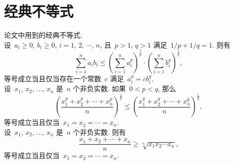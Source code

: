 \chapter{经典不等式}
论文中用到的经典不等式.\\

设~$a_i\geq0$, $b_i\geq0$, $i=1$, $2$, $\cdots$, $n$, 且~$p>1$, $q>1$
满足~$1/p+1/q=1$. 则有
\[
    \sum_{i=1}^{n}a_ib_i\leq\left(\sum_{i=1}^{n}a_i^p\right)^{\frac1p}
    \cdot\left(\sum_{i=1}^{n}b_i^q\right)^{\frac1q},
\]
等号成立当且仅当存在一个常数~$c$ 满足~$a_i^p=cb_i^q$.\\

设~$x_1$, $x_2$, $\ldots$, $x_n$ 是~$n$ 个非负实数. 如果~$0<p<q$, 那么
\[
    \left(\frac{x_1^p+x_2^p+\cdots+x_n^p}{n}\right)^{\frac{1}{p}}\leq
    \left(\frac{x_1^q+x_2^q+\cdots+x_n^q}{n}\right)^{\frac{1}{q}},
\]
等号成立当且仅当~$x_1=x_2=\cdots =x_n$.\\

设~$x_1$, $x_2$, $\ldots$, $x_n$ 是~$n$ 个非负实数. 则有
\[
    \frac{x_1+x_2+\cdots+x_n}{n}\geq\sqrt[n]{x_1x_2\cdots x_n},
\]
等号成立当且仅当~$x_1=x_2=\cdots =x_n$.